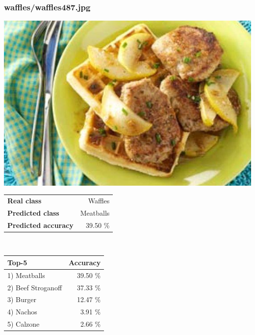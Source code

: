 \subsubsection{waffles/waffles487.jpg}

\begin{minipage}[t]{0.4\textwidth}
	\vspace{0pt}
	\includegraphics[width=\linewidth]{images/evaluation-images/waffles/waffles487.jpg}
\end{minipage}
\hfill
\begin{minipage}[t]{0.5\textwidth}
	\vspace{0pt}\raggedright
	\begin{tabularx}{\textwidth}{X r}
		\small \textbf{Real class} & \small Waffles\\
		\small \textbf{Predicted class} & \small Meatballs\\
		\small \textbf{Predicted accuracy} & \small 39.50 \%
    \end{tabularx}\\
    
    \vspace{6pt}
	\begin{tabularx}{\textwidth}{X r}
        \small \textbf{Top-5} & \small \textbf{Accuracy} \\
        \hline
		\small 1) Meatballs & \small 39.50 \%\\\small 2) Beef Stroganoff & \small 37.33 \%\\\small 3) Burger & \small 12.47 \%\\\small 4) Nachos & \small 3.91 \%\\\small 5) Calzone & \small 2.66 \%
    \end{tabularx}
\end{minipage}
    